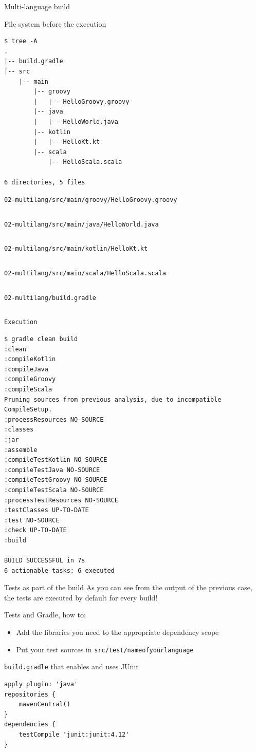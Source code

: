 \documentclass[presentation]{beamer}
\newcommand{\codefile}[3]{
	\begin{block}{\texttt{#1}}
		\inputminted[fontsize=#2,linenos=true,breaklines=true]{#3}{workspace/#1}
	\end{block}
}
\newcommand{\java}[2]{\codefile{#1}{#2}{java}}
\newcommand{\groovy}[2]{\codefile{#1}{#2}{groovy}}
\newcommand{\kotlin}[2]{\codefile{#1}{#2}{kotlin}}
\newcommand{\scala}[2]{\codefile{#1}{#2}{scala}}
\begin{document}
\begin{frame}{Multi-language build}
	\begin{block}{File system before the execution}
		\begin{verbatim}
$ tree -A
.
|-- build.gradle
|-- src
    |-- main
        |-- groovy
        |   |-- HelloGroovy.groovy
        |-- java
        |   |-- HelloWorld.java
        |-- kotlin
        |   |-- HelloKt.kt
        |-- scala
            |-- HelloScala.scala

6 directories, 5 files
		\end{verbatim}
	\end{block}
	\groovy{02-multilang/src/main/groovy/HelloGroovy.groovy}{\normalsize}
	\java{02-multilang/src/main/java/HelloWorld.java}{\normalsize}
	\kotlin{02-multilang/src/main/kotlin/HelloKt.kt}{\normalsize}
	\scala{02-multilang/src/main/scala/HelloScala.scala}{\normalsize}
	\groovy{02-multilang/build.gradle}{\tiny}
	\begin{block}{\texttt{Execution}}
		\begin{verbatim}
$ gradle clean build
:clean
:compileKotlin
:compileJava
:compileGroovy
:compileScala
Pruning sources from previous analysis, due to incompatible CompileSetup.
:processResources NO-SOURCE
:classes
:jar
:assemble
:compileTestKotlin NO-SOURCE
:compileTestJava NO-SOURCE
:compileTestGroovy NO-SOURCE
:compileTestScala NO-SOURCE
:processTestResources NO-SOURCE
:testClasses UP-TO-DATE
:test NO-SOURCE
:check UP-TO-DATE
:build

BUILD SUCCESSFUL in 7s
6 actionable tasks: 6 executed
		\end{verbatim}
	\end{block}
\end{frame}

\begin{frame}[fragile]{Tests as part of the build}
	As you can see from the output of the previous case, the tests are executed by default for every build!
	\begin{block}{Tests and Gradle, how to:}
		\begin{itemize}
			\item Add the libraries you need to the appropriate dependency scope
			\item Put your test sources in \texttt{src/test/nameofyourlanguage}
		\end{itemize}
	\end{block}
	\begin{block}{\texttt{build.gradle} that enables and uses JUnit}
		\begin{verbatim}
apply plugin: 'java'
repositories {
    mavenCentral()
}
dependencies {
    testCompile 'junit:junit:4.12'
}
		\end{verbatim}
	\end{block}
\end{frame}
\end{document}
